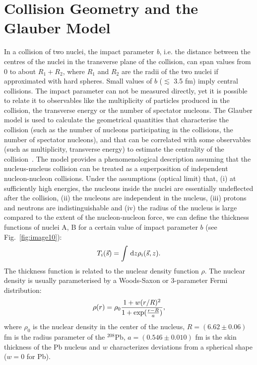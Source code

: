 \section{Collision Geometry and the Glauber Model}
\label{sec:glauber}
In a collision of two nuclei, the impact parameter \textit{b}, i.e. the distance 
between the centres of the nuclei in the transverse plane of the collision, can 
span values from 0 to about $R_1+R_2$, where  $R_1$ and  $R_2$ are the radii of 
the two nuclei if approximated with hard spheres. 
Small values of $b$ ($\lesssim$ 3.5 fm) imply central collisions. 
The impact parameter can not be measured directly, yet it is 
possible to relate it to observables like the multiplicity of particles produced in the 
collision, the transverse 
energy or the number of spectator nucleons. 
The Glauber model is used to calculate the geometrical quantities that 
characterise the collision (such as the number of nucleons participating in the collisions,
the number of spectator nucleons), and that can be correlated with some
observables (such as multiplicity, transverse energy) to estimate the centrality of the
collision~\cite{Miller:2007ri}.
The model provides a phenomenological description assuming that the nucleus-nucleus 
collision can be treated as a superposition of independent nucleon-nucleon collisions.
Under the assumptions (optical limit) that, (i) at sufficiently high energies, the nucleons 
inside the nuclei are essentially undeflected after the collision, (ii) the
 nucleons are independent in the nucleus, (iii) protons and neutrons 
 are indistinguishable and (iv) the radius of the nucleus is large compared 
 to the extent of the nucleon-nucleon force, we can define the thickness 
 functions of nuclei A, B for a certain value of impact parameter $b$ (see Fig.~\ref{fig:image10}):
\begin{equation}
T_i(\vec s) = \int\,{\rm d}z \rho_i(\vec s,z).
\end{equation}
The thickness function is related to the nuclear density function $\rho$. The nuclear 
density is usually parameterised by a Woods-Saxon or 3-parameter Fermi distribution:
\begin{equation}
\rho (r) = \rho_0 \frac{1+w(r/R)^2}{1+{\rm exp}(\frac{r-R}{a})},
\end{equation}
where $\rho_0$ is the nuclear density in the center of the nucleus, 
$R = (6.62 \pm 0.06)$ fm is the radius parameter of the ${}^{208}$Pb, 
$a = (0.546 \pm 0.010)$ fm is the skin thickness of the Pb nucleus and $w$ 
characterizes deviations from a spherical shape ($w=0$ for Pb). 
